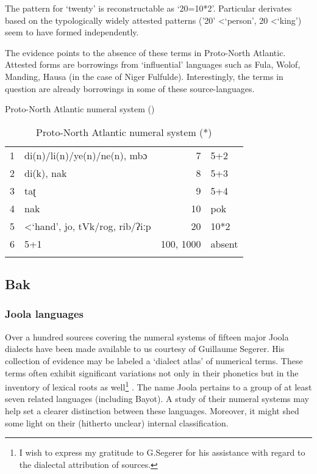 The pattern for ‘twenty’ is reconstructable as ‘20=10*2’. Particular derivates based on the typologically widely attested patterns (’20’ <‘person’, 20 <‘king’) seem to have formed independently.


The evidence points to the absence of these terms in Proto-North Atlantic. Attested forms are borrowings from ‘influential’ languages such as Fula, Wolof, Manding, Hausa (in the case of Niger Fulfulde). Interestingly, the terms in question are already borrowings in some of these source-languages.

Proto-North Atlantic numeral system ()

\begin{table}
\caption{\label{tab:3:233}Proto-North Atlantic numeral system (*)}


\begin{tabularx}{\textwidth}{lQrQ}
\lsptoprule

1 & di(n)/li(n)/ye(n)/ne(n), mbɔ & 7 & 5+2\\
2 & di(k), nak & 8 & 5+3\\
3 & taʈ & 9 & 5+4\\
4 & nak & 10 & pok\\
5 & <‘hand’, jo, tVk/rog, rib/ʔiːp & 20 & 10*2\\
6 & 5+1 & 100, 1000 & absent\\
\lspbottomrule
\end{tabularx}
\end{table}

 
\subsection{Bak}%
\subsubsection{Joola languages}%
Over a hundred sources covering the numeral systems of fifteen major Joola dialects have been made available to us courtesy of Guillaume Segerer. His collection of evidence may be labeled a ‘dialect atlas’ of numerical terms. These terms often exhibit significant variations not only in their phonetics but in the inventory of lexical roots as well\footnote{I wish to express my gratitude to G.Segerer for his assistance with regard to the dialectal attribution of sources.} . The name Joola pertains to a group of at least seven related languages (including Bayot). A study of their numeral systems may help set a clearer distinction between these languages. Moreover, it might shed some light on their (hitherto unclear) internal classification.

